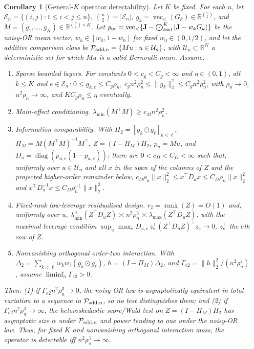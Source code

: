 \documentclass[12pt]{article}
\newtheorem{corollary}{Corollary}
\newcommand{\1}{\mathbf{1}}
\begin{document}
\begin{corollary}[General-$K$ operator detectability]
\label{cor:nork-cor}
Let $K$ be fixed. For each $n$, let $\mathcal E_n=\{(i,j):1\le i<j\le n\}$, $\binom{n}{2}=|\mathcal E_n|$,
$g_k=\operatorname{vec}_<(G_k)\in\mathbb R^{\binom n2}$, and $M=(g_1,\ldots,g_K)\in\mathbb R^{\binom n2\times K}$.
Let $p_{\rm or}=\operatorname{vec}_<\{\mathbf J-\bigodot_{k=1}^K(\mathbf J-w_kG_k)\}$ be the noisy-OR
mean vector, $w_k\in[w_0,1-w_0]$ for fixed $w_0\in(0,1/2)$, and let the additive comparison class be
$\mathcal P_{{\rm add},n}=\{Mu:u\in\mathcal U_n\}$, with $\mathcal U_n\subset\mathbb R^K$ a
deterministic set for which $Mu$ is a valid Bernoulli mean. Assume:
\begin{enumerate}
\item[(A1)] \emph{Sparse bounded layers.} For constants $0<c_g<C_g<\infty$ and $\eta\in(0,1)$, all
$k\le K$ and $e\in\mathcal E_n$: $0\le g_{k,e}\le C_g\rho_n$, $c_gn^2\rho_n^2\le\|g_k\|_2^2\le
C_gn^2\rho_n^2$, with $\rho_n\to0$, $n^2\rho_n\to\infty$, and $KC_g\rho_n\le\eta$ eventually.
\item[(A2)] \emph{Main-effect conditioning.} $\lambda_{\min}(M^\top M)\ge c_Mn^2\rho_n^2$.
\item[(A3)] \emph{Information comparability.} With $H_2=[g_k\odot g_\ell]_{k<\ell}$,
$\Pi_M=M(M^\top M)^{-1}M^\top$, $Z=(I-\Pi_M)H_2$, $p_u=Mu$, and $D_u=\operatorname{diag}(p_{u,e}
(1-p_{u,e}))$: there are $0<c_D<C_D<\infty$ such that, uniformly over $u\in\mathcal U_n$ and all $x$ in
the span of the columns of $Z$ and the projected higher-order remainder below,
$c_D\rho_n\|x\|_2^2\le x^\top D_ux\le C_D\rho_n\|x\|_2^2$ and $x^\top D_u^{-1}x\le C_D\rho_n^{-1}
\|x\|_2^2$.
\item[(A4)] \emph{Fixed-rank low-leverage residualised design.} $r_2=\operatorname{rank}(Z)=O(1)$ and,
uniformly over $u$, $\lambda_{\min}^+(Z^\top D_uZ)\asymp n^2\rho_n^5\asymp\lambda_{\max}(Z^\top D_uZ)$,
with the maximal leverage condition $\sup_u\max_e D_{u,e}\,z_e^\top(Z^\top D_uZ)^+z_e\to0$, $z_e^\top$
the $e$th row of $Z$.
\item[(A5)] \emph{Nonvanishing orthogonal order-two interaction.} With
$\Delta_2=\sum_{k<\ell}w_kw_\ell(g_k\odot g_\ell)$, $h=(I-\Pi_M)\Delta_2$, and
$\Gamma_{e2}=\|h\|_2^2/(n^2\rho_n^4)$, assume $\liminf_n\Gamma_{e2}>0$.
\end{enumerate}
Then: \textup{(1)} if $\Gamma_{e2}n^2\rho_n^3\to0$, the noisy-OR law is asymptotically equivalent in
total variation to a sequence in $\mathcal P_{{\rm add},n}$, so no test distinguishes them; and
\textup{(2)} if $\Gamma_{e2}n^2\rho_n^3\to\infty$, the heteroskedastic score/Wald test on
$Z=(I-\Pi_M)H_2$ has asymptotic size $\alpha$ under $\mathcal P_{{\rm add},n}$ and power tending to one
under the noisy-OR law. Thus, for fixed $K$ and nonvanishing orthogonal interaction mass, the operator
is detectable iff $n^2\rho_n^3\to\infty$.
\end{corollary}
\end{document}
